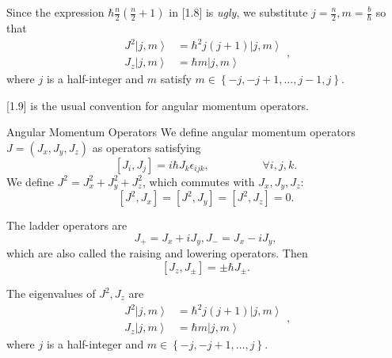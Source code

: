 \documentclass[phys334]{subfiles}
\begin{document}
    Since the expression $\hbar \frac{n}{2}\left( \frac{n}{2}+1 \right)$ in [1.8] is \textit{ugly}, we substitute $j = \frac{n}{2}, m = \frac{b}{\hbar}$ so that
    \begin{equation}
        \begin{aligned}
            J^{2}\left| j,m \right\rangle & = \hbar^{2}j\left( j+1 \right)\left| j,m \right\rangle \\
            J_z\left| j,m \right\rangle & = \hbar m\left| j,m \right\rangle
        \end{aligned} ,
    \end{equation}
    where $j$ is a half-integer and $m$ satisfy $m\in\left\lbrace -j,-j+1,\ldots,j-1,j \right\rbrace$.

    [1.9] is the usual convention for angular momentum operators.

    \begin{summary}{Angular Momentum Operators}
        We define angular momentum operators $J = \left( J_x,J_y,J_z \right)$ as operators satisfying
        \begin{equation*}
            \left[ J_i,J_j \right] = i\hbar J_k\epsilon_{ijk}, \hspace{2cm}\forall i,j,k.
        \end{equation*}
        We define $J^{2} = J_x^{2}+J_y^{2}+J_z^{2}$, which commutes with $J_x,J_y,J_z$:
        \begin{equation*}
            \left[ J^{2},J_x \right] = \left[ J^{2},J_y \right] = \left[ J^{2},J_z \right] = 0.
        \end{equation*}

        The ladder operators are
        \begin{equation*}
            J_+ = J_x+iJ_y, J_- = J_x-iJ_y,
        \end{equation*}
        which are also called the raising and lowering operators. Then
        \begin{equation*}
            \left[ J_z,J_{\pm} \right] = \pm\hbar J_{\pm}.
        \end{equation*}

        The eigenvalues of $J^{2},J_z$ are
        \begin{equation*}
            \begin{aligned}
                J^{2}\left| j,m \right\rangle & = \hbar^{2}j\left( j+1 \right)\left| j,m \right\rangle \\
                J_z\left| j,m \right\rangle & = \hbar m\left| j,m \right\rangle
            \end{aligned} ,
        \end{equation*}
        where $j$ is a half-integer and $m\in\left\lbrace -j,-j+1,\ldots,j \right\rbrace$. 
    \end{summary}
\end{document}
